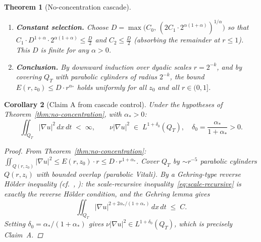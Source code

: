 \documentclass[11pt]{article}
\newtheorem{theorem}{Theorem}[section]
\newtheorem{corollary}[theorem]{Corollary}
\theoremstyle{definition}
\theoremstyle{remark}
\begin{document}
\begin{theorem}[No-concentration cascade]
\begin{enumerate}
    \item \textbf{Constant selection.}  Choose $D = \max\bigl(C_0,\,
    (2C_1\cdot 2^{\alpha(1+\alpha)})^{1/\alpha}\bigr)$ so that
    $C_1\cdot D^{1+\alpha}\cdot 2^{\alpha(1+\alpha)}\leq \tfrac{D}{2}$ and
    $C_2\leq \tfrac{D}{2}$ (absorbing the remainder at $r\leq 1$).
    This $D$ is finite for any $\alpha>0$.

    \item \textbf{Conclusion.}  By downward induction over dyadic scales
    $r = 2^{-k}$, and by covering $Q_T$ with parabolic cylinders of radius
    $2^{-k}$, the bound $E(r,z_0)\leq D\cdot r^{\alpha_*}$ holds uniformly
    for all $z_0$ and all $r\in(0,1]$.\qedhere
  \end{enumerate}
\end{theorem}

\begin{corollary}[Claim A from cascade control]\label{cor:claim-a-from-cascade}
  Under the hypotheses of Theorem~\ref{thm:no-concentration}, with $\alpha_* > 0$:
  \begin{equation}\label{eq:grad-integrability}
    \iint_{Q_T}|\nabla u|^2\,dx\,dt \;<\;\infty,
    \qquad
    \nu|\nabla u|^2 \;\in\; L^{1+\delta_0}(Q_T),
    \quad \delta_0 = \frac{\alpha_*}{1+\alpha_*} > 0.
  \end{equation}

  \begin{proof}
    From Theorem~\ref{thm:no-concentration}:
    $\iint_{Q(r,z_0)}|\nabla u|^2\leq E(r,z_0)\cdot r \leq D\cdot r^{1+\alpha_*}$.
    Cover $Q_T$ by $\sim r^{-5}$ parabolic cylinders $Q(r,z_i)$ with bounded
    overlap (parabolic Vitali).  By a Gehring-type reverse H\"{o}lder inequality
    (cf.\ \cite{Stredulinsky1984}, \cite{Giaquinta1982}): the scale-recursive
    inequality~\eqref{eq:scale-recursive} is exactly the reverse H\"{o}lder
    condition, and the Gehring lemma gives
    \[
      \iint_{Q_T}|\nabla u|^{2+2\alpha_*/(1+\alpha_*)}\,dx\,dt \;\leq\; C.
    \]
    Setting $\delta_0 = \alpha_*/(1+\alpha_*)$ gives
    $\nu|\nabla u|^2\in L^{1+\delta_0}(Q_T)$, which is precisely Claim~A.
  \end{proof}
\end{corollary}
\end{document}
